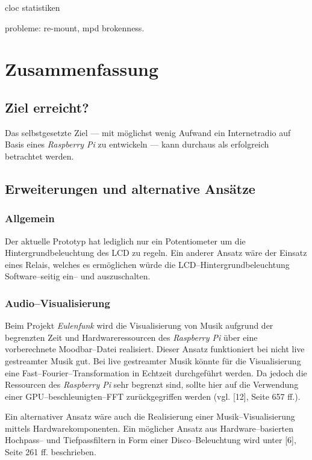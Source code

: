 \documentclass[11pt,ngerman,toc=listof,index=totoc]{scrreprt}
\begin{document}
cloc statistiken

probleme: re-mount, mpd brokenness.

\chapter{Zusammenfassung}\label{zusammenfassung}

\section{Ziel erreicht?}\label{ziel-erreicht}

Das selbstgesetzte Ziel --- mit möglichst wenig Aufwand ein
Internetradio auf Basis eines \emph{Raspberry Pi} zu entwickeln --- kann
durchaus als erfolgreich betrachtet werden.

\section{Erweiterungen und alternative
Ansätze}\label{erweiterungen-und-alternative-ansuxe4tze}

\subsection{Allgemein}\label{allgemein}

Der aktuelle Prototyp hat lediglich nur ein Potentiometer um die
Hintergrundbeleuchtung des LCD zu regeln. Ein anderer Ansatz wäre der
Einsatz eines Relais, welches es ermöglichen würde die
LCD--Hintergrundbeleuchtung Software--seitig ein-- und auszuschalten.

\subsection{Audio--Visualisierung}\label{audiovisualisierung}

Beim Projekt \emph{Eulenfunk} wird die Visualisierung von Musik aufgrund
der begrenzten Zeit und Hardwareressourcen des \emph{Raspberry Pi }über
eine vorberechnete Moodbar--Datei realisiert. Dieser Ansatz funktioniert
bei nicht live gestreamter Musik gut. Bei live gestreamter Musik könnte
für die Visualisierung eine Fast--Fourier--Transformation in Echtzeit
durchgeführt werden. Da jedoch die Ressourcen des \emph{Raspberry Pi}
sehr begrenzt sind, sollte hier auf die Verwendung einer
GPU--beschleunigten--FFT zurückgegriffen werden (vgl. {[}12{]}, Seite
657 ff.).

Ein alternativer Ansatz wäre auch die Realisierung einer
Musik--Visualisierung mittels Hardwarekomponenten. Ein möglicher Ansatz
aus Hardware--basierten Hochpass-- und Tiefpassfiltern in Form einer
Disco--Beleuchtung wird unter {[}6{]}, Seite 261 ff. beschrieben.
\end{document}
